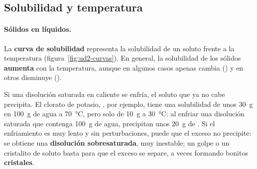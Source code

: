 \subsection{Solubilidad y temperatura}

\paragraph{Sólidos en líquidos.} La \textbf{curva de solubilidad} representa la solubilidad de un soluto frente a la temperatura
(figura~\ref{fig:ud2-curvas}). En general, la solubilidad de los sólidos \textbf{aumenta} con la temperatura, aunque en algunos
casos apenas cambia () y en otros disminuye ().

Si una disolución saturada en caliente se enfría, el soluto que ya no cabe precipita. El clorato de potasio, , por
ejemplo, tiene una solubilidad de unos \qty{30}{\gram} en \qty{100}{\gram} de agua a \qty{70}{\degreeCelsius}, pero solo de
\qty{10}{\gram} a \qty{30}{\degreeCelsius}: al enfriar una disolución saturada que contenga \qty{100}{\gram} de agua, precipitan
unos \qty{20}{\gram} de . Si el enfriamiento es muy lento y sin perturbaciones, puede que el exceso no precipite: se
obtiene una \textbf{disolución sobresaturada}, muy inestable; un golpe o un cristalito de soluto basta para que el exceso se separe,
a veces formando bonitos \textbf{cristales}.

